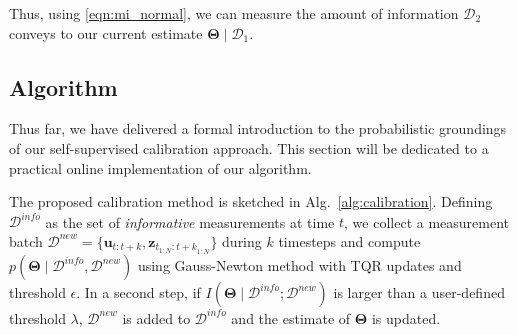 Thus, using \eqref{eqn:mi_normal}, we can measure the amount of information
$\mathcal{D}_2$ conveys to our current estimate
$\boldsymbol{\Theta}\mid\mathcal{D}_1$.

\subsection{Algorithm}

Thus far, we have delivered a formal introduction to the probabilistic
groundings of our self-supervised calibration approach. This section will be
dedicated to a practical online implementation of our algorithm.

The proposed calibration method is sketched in Alg.~\ref{alg:calibration}.
Defining $\mathcal{D}^{info}$ as the set of \emph{informative} measurements at
time $t$, we collect a measurement batch
$\mathcal{D}^{new}=\{\mathbf{u}_{t:t+k}, \mathbf{z}_{t_{1:N}:{t+k}_{1:N}}\}$
during $k$ timesteps and compute
$p(\mathbf{\Theta}\mid\mathcal{D}^{info},\mathcal{D}^{new})$ using Gauss-Newton
method with TQR updates and threshold $\epsilon$. In a second step, if
$I(\mathbf{\Theta}\mid\mathcal{D}^{info};\mathcal{D}^{new})$ is larger
than a user-defined threshold $\lambda$, $\mathcal{D}^{new}$ is added to
$\mathcal{D}^{info}$ and the estimate of $\mathbf{\Theta}$ is updated.


